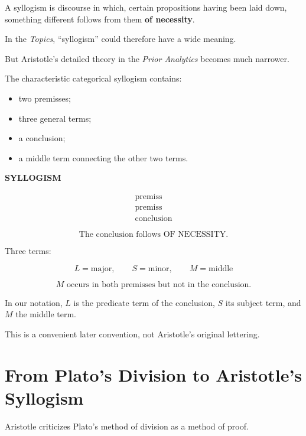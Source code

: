 \documentclass[11pt]{article}
\begin{document}
A syllogism is discourse in which, certain propositions having
been laid down, something different follows from them
\textbf{of necessity}.

In the \textit{Topics}, ``syllogism'' could therefore have a wide
meaning.

But Aristotle's detailed theory in the \textit{Prior Analytics}
becomes much narrower.

The characteristic categorical syllogism contains:

\begin{itemize}
    \item two premisses;
    \item three general terms;
    \item a conclusion;
    \item a middle term connecting the other two terms.
\end{itemize}

\begin{whiteboard}
\textbf{SYLLOGISM}

\[
\begin{array}{c}
\text{premiss}\\
\text{premiss}\\
\hline
\text{conclusion}
\end{array}
\]

\[
\boxed{\text{The conclusion follows OF NECESSITY.}}
\]

\vspace{0.5em}

Three terms:

\[
L=\text{major},
\qquad
S=\text{minor},
\qquad
M=\text{middle}
\]

\[
\boxed{
M\text{ occurs in both premisses but not in the conclusion.}
}
\]
\end{whiteboard}

In our notation, \(L\) is the predicate term of the conclusion,
\(S\) its subject term, and \(M\) the middle term.

This is a convenient later convention, not Aristotle's original
lettering.

\section{From Plato's Division to Aristotle's Syllogism}

Aristotle criticizes Plato's method of division as a method of
proof.
\end{document}
